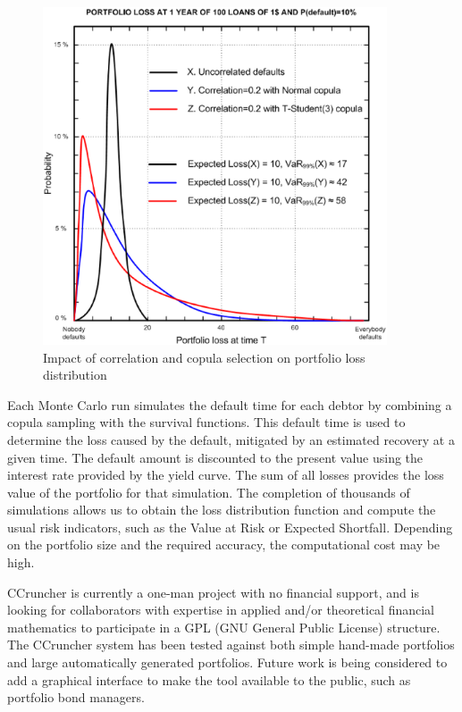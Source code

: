 \documentclass[a4paper,12pt,final]{article}
\begin{document}
\begin{figure}[!hbt]
\begin{center}
\includegraphics[height=10cm]{./images/ercim78.eps}
\caption{Impact of correlation and copula selection on portfolio loss distribution}
\label{correlation_impact}
\end{center}
\end{figure}
\FloatBarrier

Each Monte Carlo run simulates the default time for each debtor by combining a copula 
sampling with the survival functions. This default time is used to determine the loss 
caused by the default, mitigated by an estimated recovery at a given time. The default 
amount is discounted to the present value using the interest rate provided by the yield 
curve. The sum of all losses provides the loss value of the portfolio for that simulation. 
The completion of thousands of simulations allows us to obtain the loss distribution 
function and compute the usual risk indicators, such as the Value at Risk or Expected 
Shortfall. Depending on the portfolio size and the required accuracy, the computational 
cost may be high.
\newline

CCruncher is currently a one-man project with no financial support, and is looking 
for collaborators with expertise in applied and/or theoretical financial mathematics 
to participate in a GPL (GNU General Public License) structure. The CCruncher 
system has been tested against both simple hand-made portfolios and large automatically 
generated portfolios. Future work is being considered to add a graphical interface to 
make the tool available to the public, such as portfolio bond managers.
\end{document}

